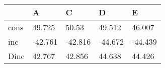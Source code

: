 \begin{tabular}{lllll}
\hline 
& A & C & D & E \\ 
\hline 
cons & 49.725 & 50.53 & 49.512 & 46.007 \\ 
inc & -42.761 & -42.816 & -44.672 & -44.439 \\ 
Dinc & 42.767 & 42.856 & 44.638 & 44.426 \\ 
\hline 
\end{tabular}